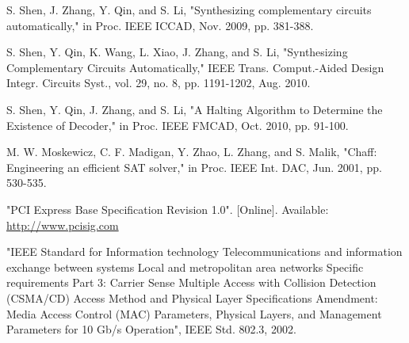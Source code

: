 \documentclass[journal]{IEEEtran}
\begin{document}
{%


%
%
%
\begin{thebibliography}{1}

S. Shen, J. Zhang, Y. Qin, and S. Li,
"Synthesizing complementary circuits automatically,"
in Proc. IEEE ICCAD, Nov. 2009, pp. 381-388.

S. Shen, Y. Qin, K. Wang, L. Xiao, J. Zhang, and S. Li,
"Synthesizing Complementary Circuits Automatically,"
IEEE Trans. Comput.-Aided Design Integr. Circuits Syst.,
vol. 29, no. 8, pp. 1191-1202, Aug. 2010.


S. Shen, Y. Qin, J. Zhang, and S. Li,
"A Halting Algorithm to Determine the Existence of Decoder,"
in Proc. IEEE FMCAD, Oct. 2010, pp. 91-100.

M. W. Moskewicz, C. F. Madigan, Y. Zhao, L. Zhang, and S. Malik,
"Chaff: Engineering an efficient SAT solver," in Proc. IEEE Int. DAC,
Jun. 2001, pp. 530-535.


"PCI Express Base Specification Revision 1.0". [Online]. Available:
  \url{http://www.pcisig.com}

"IEEE Standard for Information technology Telecommunications and
  information exchange between systems Local and metropolitan area networks
  Specific requirements Part 3: Carrier Sense Multiple Access with Collision
  Detection (CSMA/CD) Access Method and Physical Layer Specifications
  Amendment: Media Access Control (MAC) Parameters, Physical Layers, and
  Management Parameters for 10 Gb/s Operation", IEEE Std. 802.3, 2002.


\end{thebibliography}}
\end{document}
